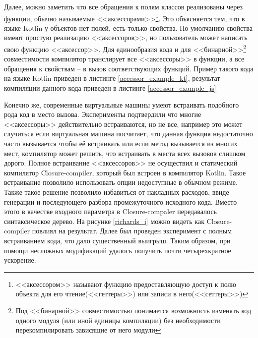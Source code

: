\newpage
Далее, можно заметить что все обращения к полям классов реализованы через функции, обычно называемые <<аксессорами>>\footnote{<<аксессором>> называют функцию предоставляющую доступ к полю объекта для его чтение(<<геттеры>>) или записи в него(<<сеттеры>>)}. Это объясняется тем, что в языке Kotlin у объектов нет полей, есть только свойства. По-умолчанию свойства имеют простую реализацию <<аксессоров>>, но пользователь может написать свою функцию <<аксессор>>. Для единообразия кода и для <<бинарной>>\footnote{Под <<бинарной>> совместимостью понимается возможность изменять код одного модуля (или иной единицы компиляции) без необходимости перекомпилировать зависящие от него модули}
совместимости компилятор транслирует все <<аксессоры>> в функции, а все обращения к свойствам -- в вызов соответствующих функций. Пример такого кода на языке Kotlin приведен в листинге \ref{accessor_example_kt}, результат компиляции данного кода приведен в листинге \ref{accessor_example_js}

\begin{code}
\end{code}

Конечно же, современные виртуальные машины умеют встраивать подобного рода код в место вызова. Эксперименты подтвердили что многие <<аксессоры>> действительно встраиваются, но не все, например это может случиться если виртуальная машина посчитает, что данная функция недостаточно часто вызывается чтобы её встраивать или если метод вызывается из многих мест, компилятор может решить, что встраивать в места всех вызовов слишком дорого. 
Полное встраивание <<аксессоров>> не осуществил и статический компилятор Closure-compiler, который был встроен в компилятор Kotlin. Такое встраивание позволило использовать опции недоступные в обычном режиме. Также такое решение позволило избавиться от накладных расходов, ввиде генерации и последующего разбора промежуточного исходного кода. Вместо этого в качестве входного параметра в Closure-compaler передавалось синтаксическое дерево. На рисунке \ref{richards_i} можно видеть как Closure-compiler повлиял на результат.
Далее был проведен эксперимент с полным встраиванием кода, что дало существенный выигрыш. Таким образом, при помощи несложных модификаций удалось получить почти четырехкратное ускорение. 

